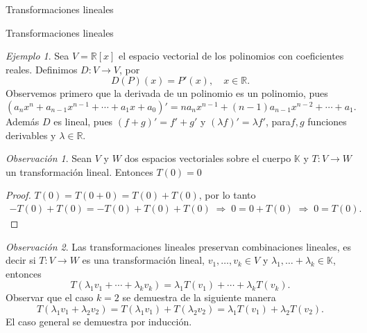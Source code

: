 \documentclass[a4paper,12pt,twoside,spanish,reqno]{amsbook}
\numberwithin{equation}{section}
\theoremstyle{definition}
\theoremstyle{remark}
\newtheorem*{ejemplo*}{Ejemplo}
\newtheorem*{obs*}{Observaci\'on}
\newcommand{\R}{\mathbb R}
\newcommand{\K}{\mathbb K}
\begin{document}
\begin{chapter}{Transformaciones lineales}
\begin{section}{Transformaciones lineales}
        
            \begin{ejemplo*}
            Sea $V = \R[x]$ el espacio vectorial de los polinomios con coeficientes reales. Definimos $D:V \to V$, por
            $$
            D(P)(x) = P'(x),\quad x \in \R. 
            $$
            Observemos primero que la derivada de un polinomio es un polinomio, pues 
            $$
            (a_nx^n+ a_{n-1}x^{n-1}+\cdots + a_1 x + a_0)' = na_nx^{n-1}+ (n-1)a_{n-1}x^{n-2}+\cdots + a_1.
            $$
            Además  $D$  es lineal, pues $(f+g)' = f' + g'$ y $(\lambda f)' = \lambda f'$, para$f,g$ funciones derivables y $\lambda \in \R$.
            \end{ejemplo*} 
        
        \begin{obs*}	Sean $V$ y $W$ dos espacios vectoriales sobre el cuerpo $\K$ y 	 $T:V \to W$			un transformación lineal. Entonces $T(0) =0$
        \end{obs*}
        \begin{proof} $T(0) = T(0+0) = T(0) + T(0)$, por lo tanto 
            \begin{align*}
                -T(0) + T(0) = -T(0) + T(0)+T(0) \;\Rightarrow\; 0 = 0 +T(0) \;\Rightarrow\; 0= T(0).
            \end{align*}
        \end{proof}
        
        \begin{obs*}
            Las transformaciones lineales preservan  combinaciones lineales, es decir si $T:V \to W$ es una transformación lineal, $ v_1,\ldots,v_k \in V$ y $\lambda_1, \ldots+ \lambda_k \in \K$,  entonces
            $$
            T(\lambda_1 v_1 + \cdots+ \lambda_k v_k) = \lambda_1 T(v_1) + \cdots+ \lambda_k T(v_k).
            $$
            Observar que el caso $k=2$ se demuestra de la siguiente manera
            $$
            T(\lambda_1 v_1 +  \lambda_2 v_2) =T(\lambda_1 v_1) + T(\lambda_2 v_2) =\lambda_1 T(v_1) + \lambda_2T( v_2).
            $$
            El caso general se demuestra por inducción. 
        
        \end{obs*}
        

\end{section}
\end{chapter}
\end{document}
